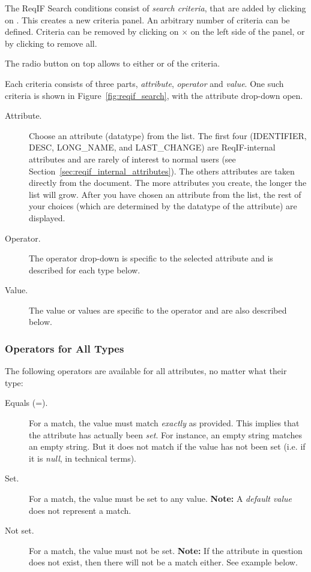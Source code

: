 {{{The ReqIF Search conditions consist of \textit{search criteria}, that are added by clicking on .  This creates a new criteria panel.  An arbitrary number of criteria can be defined.  Criteria can be removed by clicking on $\times$  on the left side of the panel, or by clicking  to remove all.

The radio button on top allows to either  or  of the criteria.

Each criteria consists of three parts, \textit{attribute}, \textit{operator} and \textit{value}.  One such criteria is shown in Figure~\ref{fig:reqif_search}, with the attribute drop-down open.

\begin{description}
\item[Attribute.]  Choose an attribute (datatype) from the list.  The first four (IDENTIFIER, DESC, LONG\_NAME, and LAST\_CHANGE) are ReqIF-internal attributes and are rarely of interest to normal users (see Section~\ref{sec:reqif_internal_attributes}).  The others attributes are taken directly from the document.  The more attributes you create, the longer the list will grow.  After you have chosen an attribute from the list, the rest of your choices (which are determined by the datatype of the attribute) are displayed.
\item[Operator.] The operator drop-down is specific to the selected attribute and is described for each type below.
\item[Value.] The value or values are specific to the operator and are also described below.
\end{description}

\subsubsection{Operators for All Types}

The following operators are available for all attributes, no matter what their type:

\begin{description}
\item[Equals (=).] For a match, the value must match \textit{exactly} as provided.  This implies that the attribute has actually been \textit{set}.  For instance, an empty string matches an empty string.  But it does not match if the value has not been set (i.e. if it is \textit{null}, in technical terms).
\item[Set.] For a match, the value must be set to any value. \textbf{Note:} A \textit{default value} does not represent a match.
\item[Not set.] For a match, the value must not be set. \textbf{Note:} If the attribute in question does not exist, then there will not be a match either.  See example below.
\end{description}

}}}
